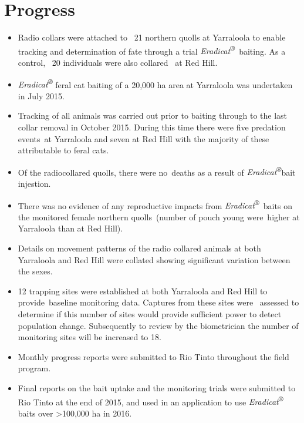 \documentclass[version=last,
    paper=a4, %
    10pt, %
    usenames,
    dvipsnames,
    oneside, %
    headings=openany, %
    DIV=15 %
]{scrbook}
\begin{document}
\section*{Progress}
\begin{itemize}
\itemsep1pt\parskip0pt
\item
  Radio collars were attached to~ 21 northern quolls at Yarraloola to
  enable tracking and determination of fate through a trial
  \emph{Eradicat\textsuperscript{®}}~baiting. As a control,~ 20
  individuals were also collared~ at Red Hill.
\item
  \emph{Eradicat\textsuperscript{®}} feral cat baiting of a 20,000 ha
  area at Yarraloola was undertaken in July 2015.
\item
  Tracking of all animals was carried out prior to baiting through to
  the last collar removal in October 2015. During this time there were
  five predation events~at Yarraloola and seven at Red Hill with the
  majority of these attributable to feral cats.
\item
  Of the radiocollared quolls, there were no~deaths as a result of
  \emph{Eradicat\textsuperscript{®}}bait injestion.
\item
  There was no evidence of any reproductive impacts from
  \emph{Eradicat\textsuperscript{®}}~baits on the monitored female
  northern quolls~(number of pouch young were~higher at Yarraloola than
  at Red Hill).
\item
  Details on movement patterns of the radio collared animals at both
  Yarraloola and Red Hill were collated showing significant variation
  between the sexes.
\item
  12 trapping sites were established at both Yarraloola and Red Hill to
  provide~baseline monitoring data. Captures from these sites were
  ~assessed to determine if this number of sites would provide
  sufficient power to detect population change. Subsequently to review
  by the biometrician the number of monitoring sites will be increased
  to 18.
\item
  Monthly progress reports were submitted to Rio Tinto throughout the
  field program.
\item
  Final reports on the bait uptake and the monitoring trials were
  submitted to Rio Tinto at the end of 2015, and used in an application
  to use \emph{Eradicat\textsuperscript{®}} baits over
  \textgreater{}100,000 ha in 2016.
\end{itemize}
\end{document}
